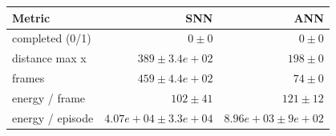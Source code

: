 \begin{tabular}{lrr}
\toprule
Metric & SNN & ANN \\
\midrule
completed (0/1) & $0 \pm 0$ & $0 \pm 0$ \\
distance max x & $389 \pm 3.4e+02$ & $198 \pm 0$ \\
frames & $459 \pm 4.4e+02$ & $74 \pm 0$ \\
energy / frame & $102 \pm 41$ & $121 \pm 12$ \\
energy / episode & $4.07e+04 \pm 3.3e+04$ & $8.96e+03 \pm 9e+02$ \\
\bottomrule
\end{tabular}
